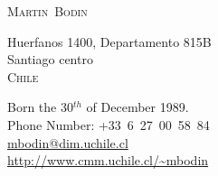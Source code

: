 \documentclass[12pt,a4paper]{article}
\begin{document}
\pagestyle{empty}


\newlength{\annee}
\settowidth{\annee}{9999—9999} %


\newlength{\texte}
\setlength{\texte}{\textwidth} \addtolength{\texte}{-\annee} 
	\addtolength{\texte}{-2\tabcolsep}

\begin{center} \Huge \textsc{Martin~Bodin} \end{center}

\parbox{0.5\textwidth}
{
  \noindent
  Huerfanos 1400, Departamento 815B \\
  Santiago centro \\
  \textsc{Chile}
}
\parbox{.55\textwidth}
{
\begin{flushright}
  Born the 30\(^{th}\) of December 1989. \\
  \noindent Phone Number: \mbox{+33 6 27 00 58 84} \\
  \url{mbodin@dim.uchile.cl} \\
  \url{http://www.cmm.uchile.cl/~mbodin}
\end{flushright}
}
\end{document}
